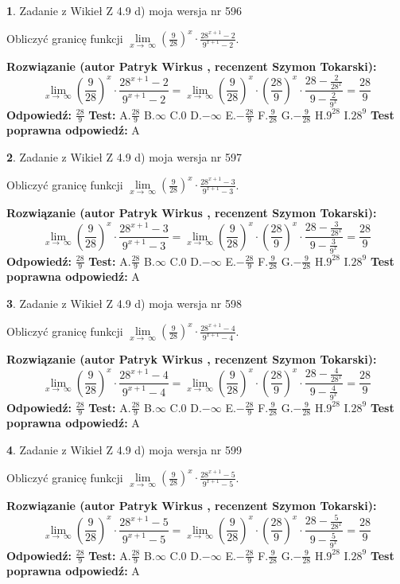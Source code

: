 \documentclass[12pt, a4paper]{article}
\theoremstyle{definition} %
\newtheorem{zad}{}
\newcommand{\zadStart}[1]{\begin{zad}#1\newline}
\newcommand{\zadStop}{\end{zad}}
\newcommand{\rozwStart}[2]{\noindent \textbf{Rozwiązanie (autor #1 , recenzent #2): }\newline}
\newcommand{\rozwStop}{\newline}
\newcommand{\odpStart}{\noindent \textbf{Odpowiedź:}\newline}
\newcommand{\odpStop}{\newline}
\newcommand{\testStart}{\noindent \textbf{Test:}\newline}
\newcommand{\testStop}{\newline}
\newcommand{\kluczStart}{\noindent \textbf{Test poprawna odpowiedź:}\newline}
\newcommand{\kluczStop}{\newline}
\begin{document}
\zadStart{Zadanie z Wikieł Z 4.9 d) moja wersja nr 596}


Obliczyć granicę funkcji  $\lim\limits_{x\to\ \infty}(\frac{9}{28})^{x}\cdot\frac{28^{x+1}-2}{9^{x+1}-2}$.
\zadStop
\rozwStart{Patryk Wirkus}{Szymon Tokarski}
$$\lim\limits_{x\to\ \infty}(\frac{9}{28})^{x}\cdot\frac{28^{x+1}-2}{9^{x+1}-2}=\lim\limits_{x\to\ \infty}(\frac{9}{28})^{x}\cdot(\frac{28}{9})^{x} \cdot \frac{28-\frac{2}{28^{x}}}{9-\frac{2}{9^{x}}} = \frac{28}{9}$$
\rozwStop
\odpStart
$\frac{28}{9}$
\odpStop
\testStart
A.$\frac{28}{9}$ B.$\infty$ C.$0$ D.$-\infty$ E.$-\frac{28}{9}$
F.$\frac{9}{28}$ G.$-\frac{9}{28}$
H.$9^{28}$
I.$28^{9}$
\testStop
\kluczStart
A
\kluczStop



\zadStart{Zadanie z Wikieł Z 4.9 d) moja wersja nr 597}


Obliczyć granicę funkcji  $\lim\limits_{x\to\ \infty}(\frac{9}{28})^{x}\cdot\frac{28^{x+1}-3}{9^{x+1}-3}$.
\zadStop
\rozwStart{Patryk Wirkus}{Szymon Tokarski}
$$\lim\limits_{x\to\ \infty}(\frac{9}{28})^{x}\cdot\frac{28^{x+1}-3}{9^{x+1}-3}=\lim\limits_{x\to\ \infty}(\frac{9}{28})^{x}\cdot(\frac{28}{9})^{x} \cdot \frac{28-\frac{3}{28^{x}}}{9-\frac{3}{9^{x}}} = \frac{28}{9}$$
\rozwStop
\odpStart
$\frac{28}{9}$
\odpStop
\testStart
A.$\frac{28}{9}$ B.$\infty$ C.$0$ D.$-\infty$ E.$-\frac{28}{9}$
F.$\frac{9}{28}$ G.$-\frac{9}{28}$
H.$9^{28}$
I.$28^{9}$
\testStop
\kluczStart
A
\kluczStop



\zadStart{Zadanie z Wikieł Z 4.9 d) moja wersja nr 598}


Obliczyć granicę funkcji  $\lim\limits_{x\to\ \infty}(\frac{9}{28})^{x}\cdot\frac{28^{x+1}-4}{9^{x+1}-4}$.
\zadStop
\rozwStart{Patryk Wirkus}{Szymon Tokarski}
$$\lim\limits_{x\to\ \infty}(\frac{9}{28})^{x}\cdot\frac{28^{x+1}-4}{9^{x+1}-4}=\lim\limits_{x\to\ \infty}(\frac{9}{28})^{x}\cdot(\frac{28}{9})^{x} \cdot \frac{28-\frac{4}{28^{x}}}{9-\frac{4}{9^{x}}} = \frac{28}{9}$$
\rozwStop
\odpStart
$\frac{28}{9}$
\odpStop
\testStart
A.$\frac{28}{9}$ B.$\infty$ C.$0$ D.$-\infty$ E.$-\frac{28}{9}$
F.$\frac{9}{28}$ G.$-\frac{9}{28}$
H.$9^{28}$
I.$28^{9}$
\testStop
\kluczStart
A
\kluczStop



\zadStart{Zadanie z Wikieł Z 4.9 d) moja wersja nr 599}


Obliczyć granicę funkcji  $\lim\limits_{x\to\ \infty}(\frac{9}{28})^{x}\cdot\frac{28^{x+1}-5}{9^{x+1}-5}$.
\zadStop
\rozwStart{Patryk Wirkus}{Szymon Tokarski}
$$\lim\limits_{x\to\ \infty}(\frac{9}{28})^{x}\cdot\frac{28^{x+1}-5}{9^{x+1}-5}=\lim\limits_{x\to\ \infty}(\frac{9}{28})^{x}\cdot(\frac{28}{9})^{x} \cdot \frac{28-\frac{5}{28^{x}}}{9-\frac{5}{9^{x}}} = \frac{28}{9}$$
\rozwStop
\odpStart
$\frac{28}{9}$
\odpStop
\testStart
A.$\frac{28}{9}$ B.$\infty$ C.$0$ D.$-\infty$ E.$-\frac{28}{9}$
F.$\frac{9}{28}$ G.$-\frac{9}{28}$
H.$9^{28}$
I.$28^{9}$
\testStop
\kluczStart
A
\kluczStop
\end{document}
